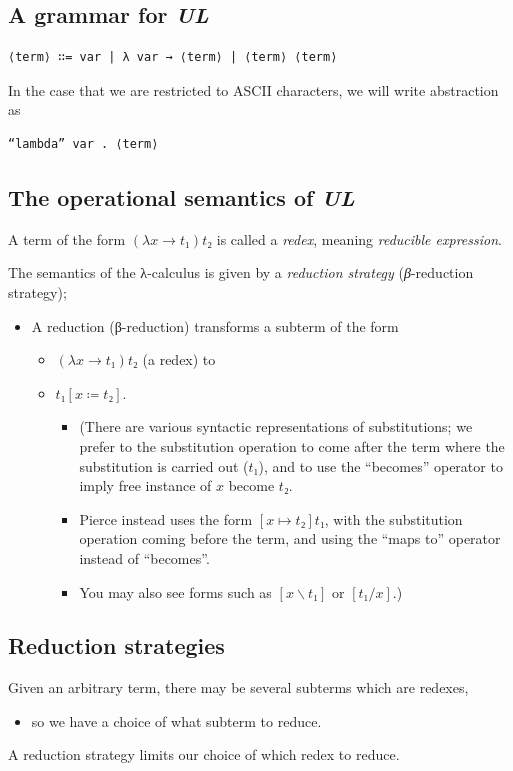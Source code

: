 \documentclass[11pt]{article}
\theoremstyle{definition}
\begin{document}
\subsection{A grammar for \emph{UL}}
\label{sec:org4e92fec}
\begin{verbatim}
⟨term⟩ ∷= var | λ var → ⟨term⟩ | ⟨term⟩ ⟨term⟩
\end{verbatim}

In the case that we are restricted to ASCII characters,
we will write abstraction as
\begin{verbatim}
“lambda” var . ⟨term⟩
\end{verbatim}

\subsection{The operational semantics of \emph{UL}}
\label{sec:org6a42d97}
A term of the form \((λ x → t₁) t₂\) is called a \emph{redex},
meaning \emph{reducible expression}.

The semantics of the λ-calculus is given by a \emph{reduction strategy}
(\emph{β}-reduction strategy);
\begin{itemize}
\item A reduction (β-reduction) transforms a subterm of the form
\begin{itemize}
\item \((λ x → t₁) t₂\) (a redex) to
\item \(t₁[x ≔ t₂]\).
\begin{itemize}
\item (There are various syntactic representations of substitutions;
we prefer to the substitution operation to come after the term
where the substitution is carried out (\(t₁\)), and to use
the “becomes” operator to imply free instance of \(x\) become \(t₂\).
\item Pierce instead uses the form \([x ↦ t₂]t₁\), with the
substitution operation coming before the term,
and using the “maps to” operator instead of “becomes”.
\item You may also see forms such as \([x\backslash t₁]\) or \([t₁/x]\).)
\end{itemize}
\end{itemize}
\end{itemize}

\subsection{Reduction strategies}
\label{sec:org5f1c31e}
Given an arbitrary term, there may be several subterms which are redexes,
\begin{itemize}
\item so we have a choice of what subterm to reduce.
\end{itemize}
A reduction strategy limits our choice of which redex to reduce.
\end{document}
